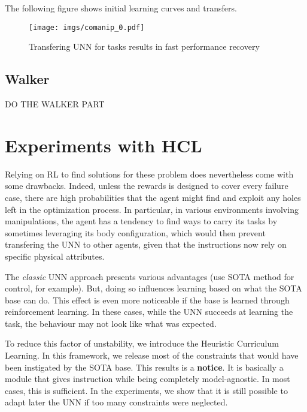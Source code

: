 \documentclass[letterpaper, 10 pt, conference]{ieeeconf}  %
\begin{document}
The following figure shows initial learning curves and transfers.  

\begin{figure}
\centering
\texttt{[image: imgs/comanip\_0.pdf]}
\caption{Transfering UNN for tasks results in fast performance recovery}
\label{transfer0}
\end{figure}



\subsection{Walker} %
\label{sub:walker}

\uppercase{Do the walker part}

\section{Experiments with HCL} %
\label{sec:experiments_with_hcl}

Relying on RL to find solutions for these problem does nevertheless come with some drawbacks. Indeed, unless the rewards is designed to cover every failure case, there are high probabilities that the agent might find and exploit any holes left in the optimization process. In particular, in various environments involving manipulations, the agent has a tendency to find ways to carry its tasks by sometimes leveraging its body configuration, which would then prevent transfering the UNN to other agents, given that the instructions now rely on specific physical attributes.  

The \textit{classic} UNN approach presents various advantages (use SOTA method for control, for example). But, doing so influences learning based on what the SOTA base can do. This effect is even more noticeable if the base is learned through reinforcement learning. In these cases, while the UNN succeeds at learning the task, the behaviour may not look like what was expected. 

To reduce this factor of unstability, we introduce the Heuristic Curriculum Learning. In this framework, we release most of the constraints that would have been instigated by the SOTA base. This results is a \textbf{notice}. It is basically a module that gives instruction while being completely model-agnostic. In most cases, this is sufficient. In the experiments, we show that it is still possible to adapt later the UNN if too many constraints were neglected.    
\end{document}
